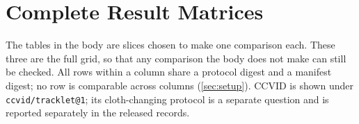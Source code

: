 \appendices
\section{Complete Result Matrices}\label{sec:appendix}
The tables in the body are slices chosen to make one comparison each. These three are the full
grid, so that any comparison the body does not make can still be checked. All rows within a
column share a protocol digest and a manifest digest; no row is comparable across columns
(\cref{sec:setup}). CCVID is shown under \texttt{ccvid/tracklet@1}; its cloth-changing
protocol is a separate question and is reported separately in the released records.

\begin{table}[htbp]
\centering
\caption{Frozen encoders, ranked by cosine similarity over the raw pooled features, mAP. This
is the zero-shot convention, and it is the ordering \cref{sec:readout} shows is not stable.}
\label{tab:appendix-frozen}

\end{table}

\begin{table}[htbp]
\centering
\caption{The ArcFace head fitted on \texttt{market1501/train}, applied unchanged everywhere,
mAP. Market-1501 is the only in-domain column.}
\label{tab:appendix-map}

\end{table}

\begin{table}[htbp]
\centering
\caption{The same configurations as \cref{tab:appendix-map}, Rank-1. Reported because mAP and
Rank-1 do not always agree --- notably on CCVID, where several encoders separate on one and not
on the other.}
\label{tab:appendix-r1}

\end{table}
